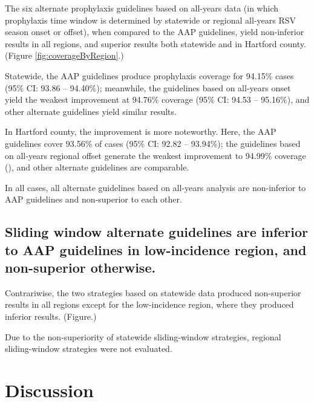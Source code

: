 \documentclass{article}\usepackage[]{graphicx}\usepackage[]{color}
\begin{document}
\begin{multicols}{2}
The six alternate prophylaxis guidelines based on all-years data (in which prophylaxis time window is determined by statewide or regional all-years RSV season onset or offset), when compared to the AAP guidelines, yield non-inferior results in all regions, and superior results both statewide and in Hartford county. (Figure \ref{fig:coverageByRegion}.)

Statewide, the AAP guidelines produce prophylaxis coverage for 94.15\% cases (95\% CI: 93.86 -- 94.40\%); meanwhile, the guidelines based on all-years onset yield the weakest improvement at 94.76\% coverage (95\% CI: 94.53 -- 95.16\%), and other alternate guidelines yield similar results.

In Hartford county, the improvement is more noteworthy. Here, the AAP guidelines cover 93.56\% of cases (95\% CI: 92.82 -- 93.94\%); the guidelines based on all-years regional offset generate the weakest improvement to 94.99\% coverage (), and other alternate guidelines are comparable.

In all cases, all alternate guidelines based on all-years analysis are non-inferior to AAP guidelines and non-superior to each other. 

\subsection{Sliding window alternate guidelines are inferior to AAP guidelines in low-incidence region, and non-superior otherwise.}

Contrariwise, the two strategies based on statewide data produced non-superior results in all regions except for the low-incidence region, where they produced inferior results. (Figure.)

Due to the non-superiority of statewide sliding-window strategies, regional sliding-window strategies were not evaluated. 

\section{Discussion}



\end{multicols}
\end{document}
